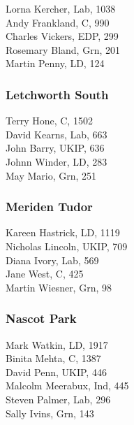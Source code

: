 \documentclass[a4paper,openany,10pt]{book}
\begin{document}


Lorna Kercher, Lab, 1038\\
Andy Frankland, C, 990\\
Charles Vickers, EDP, 299\\
Rosemary Bland, Grn, 201\\
Martin Penny, LD, 124\\


\subsubsection*{Letchworth South}



Terry Hone, C, 1502\\
David Kearns, Lab, 663\\
John Barry, UKIP, 636\\
Johnn Winder, LD, 283\\
May Mario, Grn, 251\\


\subsubsection*{Meriden Tudor}



Kareen Hastrick, LD, 1119\\
Nicholas Lincoln, UKIP, 709\\
Diana Ivory, Lab, 569\\
Jane West, C, 425\\
Martin Wiesner, Grn, 98\\


\subsubsection*{Nascot Park}



Mark Watkin, LD, 1917\\
Binita Mehta, C, 1387\\
David Penn, UKIP, 446\\
Malcolm Meerabux, Ind, 445\\
Steven Palmer, Lab, 296\\
Sally Ivins, Grn, 143\\
\end{document}
